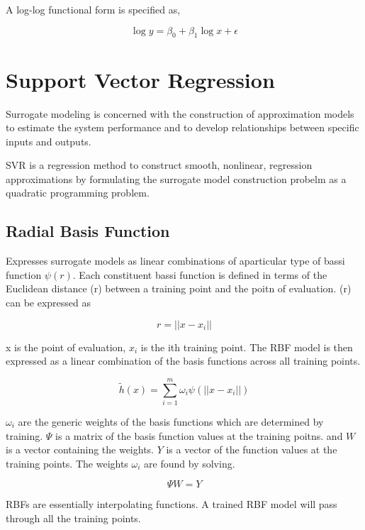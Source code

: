 \documentclass[12pt, a4paper]{report}
\begin{document}
  A log-log functional form is specified as,

  \begin{equation}
    \log y = \beta_0 + \beta_1 \log x + \epsilon
  \end{equation}

  \section{Support Vector Regression}

  Surrogate modeling is concerned with the construction of approximation models to estimate the system performance and to develop relationships between specific inputs and outputs.

  SVR is a regression method to construct smooth, nonlinear, regression approximations by formulating the surrogate model construction probelm as a quadratic programming problem.

  \subsection{Radial Basis Function}

  Expresses surrogate models as linear combinations of aparticular type of bassi function $ \psi(r). $ Each constituent bassi function is defined in terms of the Euclidean distance (r) between a training point and the poitn of evaluation. (r) can be expressed as

  \begin{equation}
    r = ||x - x_i||
  \end{equation}

  x is the point of evaluation, $ x_i $ is the ith training point. The RBF model is then expressed as a linear combination of the basis functions across all training points.

  \begin{equation}
    \tilde h(x) = \sum_{i=1}^{m}\omega_i \psi \left( ||x - x_i|| \right)
  \end{equation}

  $ \omega_i $ are the generic weights of the basis functions which are determined by training. $ \Psi $ is a matrix of the basis function values at the training poitns. and $ W $ is a vector containing the weights. $ Y $ is a vector of the function values at the training points. The weights $ \omega_i $ are found by solving.

  \begin{equation}
    \Psi W = Y
  \end{equation}

  RBFs are essentially interpolating functions. A trained RBF model will pass through all the training points.
\end{document}

